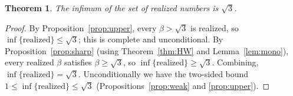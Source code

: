 \documentclass[11pt]{article}
\newtheorem{theorem}{Theorem}
\theoremstyle{definition}
\begin{document}
\begin{theorem}\label{thm:main}
The infimum of the set of realized numbers is $\sqrt3$.
\end{theorem}

\begin{proof}
By Proposition~\ref{prop:upper}, every $\beta>\sqrt3$ is realized, so
$\inf\{\text{realized}\}\le\sqrt3$; this is complete and unconditional. By
Proposition~\ref{prop:sharp} (using Theorem~\ref{thm:HW} and Lemma~\ref{lem:mono}), every
realized $\beta$ satisfies $\beta\ge\sqrt3$, so $\inf\{\text{realized}\}\ge\sqrt3$. Combining,
$\inf\{\text{realized}\}=\sqrt3$. Unconditionally we have the two-sided bound
$1\le\inf\{\text{realized}\}\le\sqrt3$ (Propositions~\ref{prop:weak} and \ref{prop:upper}).
\end{proof}
\end{document}
